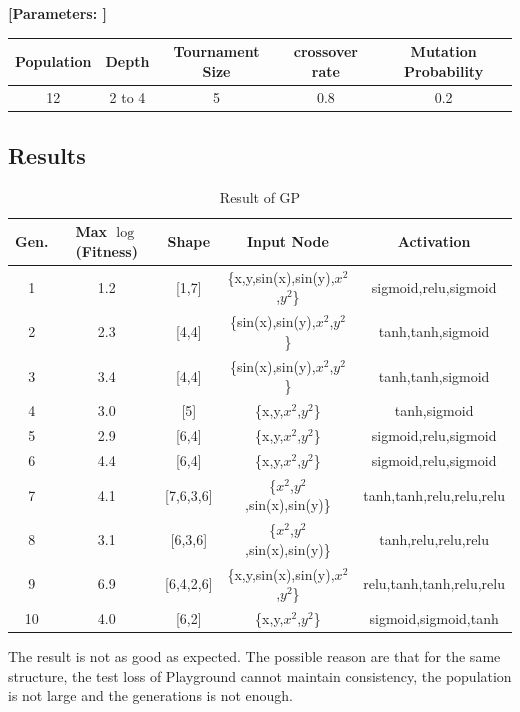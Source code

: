 \documentclass[12pt]{article}
\begin{document}
\textbf{[Parameters: ]}
\begin{center}
\begin{tabular}{ccccc}
\toprule
Population & Depth & Tournament Size & crossover rate & Mutation Probability \\ \midrule
12 & 2 to 4 & 5 & 0.8 & 0.2  \\
\bottomrule
\end{tabular}
\end{center}
\subsection{Results}

\begin{table}[h]
\centering
\begin{tabular}{ccccc}
\toprule
Gen.  & Max $\log$(Fitness) & Shape & Input Node  &Activation \\ \midrule
1 & 1.2 & [1,7]&\{x,y,sin(x),sin(y),$x^2$,$y^2$\} &sigmoid,relu,sigmoid \\
2 & 2.3 & [4,4]&\{sin(x),sin(y),$x^2$,$y^2$\} &tanh,tanh,sigmoid  \\
3 & 3.4 & [4,4]&\{sin(x),sin(y),$x^2$,$y^2$\} &tanh,tanh,sigmoid  \\
4 & 3.0 & [5]&\{x,y,$x^2$,$y^2$\} &tanh,sigmoid   \\
5 & 2.9 & [6,4]&\{x,y,$x^2$,$y^2$\} &sigmoid,relu,sigmoid  \\
6 & 4.4 & [6,4]&\{x,y,$x^2$,$y^2$\}  &sigmoid,relu,sigmoid  \\
7 & 4.1 & [7,6,3,6]&\{$x^2$,$y^2$,sin(x),sin(y)\} &tanh,tanh,relu,relu,relu  \\
8 & 3.1 & [6,3,6]&\{$x^2$,$y^2$,sin(x),sin(y)\}&tanh,relu,relu,relu    \\
9 & 6.9 & [6,4,2,6]&\{x,y,sin(x),sin(y),$x^2$,$y^2$\}  &relu,tanh,tanh,relu,relu   \\
10 & 4.0 & [6,2]&\{x,y,$x^2$,$y^2$\}  &sigmoid,sigmoid,tanh  \\
\bottomrule
\end{tabular}
\caption{Result of GP}
\label{t_res_gp}

\end{table}
The result is not as good as expected. The possible reason are that for the same structure, the test loss of Playground cannot maintain consistency, the population is not large and the generations is not enough.
\end{document}
